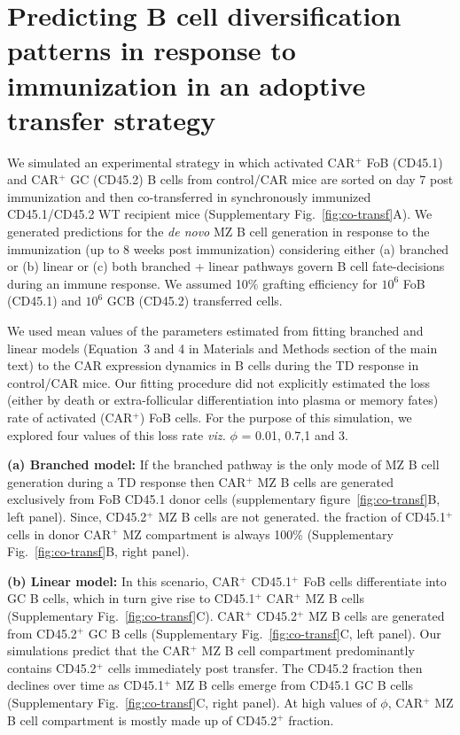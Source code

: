\documentclass[11pt]{article}
\begin{document}
 
\clearpage


\section*{Predicting B cell diversification patterns in response to immunization in an adoptive transfer strategy}

We simulated an experimental strategy in which activated CAR$^{+}$ FoB (CD45.1) and CAR$^{+}$ GC (CD45.2) B cells from control/CAR mice are sorted on day 7 post immunization and then co-transferred in synchronously immunized CD45.1/CD45.2 WT recipient mice (Supplementary Fig.~\ref{fig:co-transf}A).
We generated predictions for the \textit{de novo} MZ B cell generation in response to the immunization (up to 8 weeks post immunization) considering either (a) branched or (b) linear or (c) both branched + linear pathways govern B cell fate-decisions during an immune response.
We assumed 10\% grafting efficiency for $10^{6}$ FoB (CD45.1) and $10^{6}$ GCB (CD45.2) transferred cells. 

We used mean values of the parameters estimated from fitting branched and linear models (Equation~3 and 4 in Materials and Methods section of the main text) to the CAR expression dynamics in B cells during the TD response in control/CAR mice.
Our fitting procedure did not explicitly estimated the loss (either by death or extra-follicular differentiation into plasma or memory fates) rate of activated (CAR$^{+}$) FoB cells.
For the purpose of this simulation, we explored four values of this loss rate \textit{viz.} $\phi$ = 0.01, 0.7,1 and 3.


\textbf{(a) Branched model:}
If the branched pathway is the only mode of MZ B cell generation during a TD response then 
CAR$^{+}$  MZ B cells are generated exclusively from FoB CD45.1 donor cells (supplementary figure~\ref{fig:co-transf}B, left panel).
Since, CD45.2$^{+}$ MZ B cells are not generated.%
the fraction of CD45.1$^{+}$ cells in donor CAR$^{+}$ MZ compartment is always 100\% (Supplementary Fig.~\ref{fig:co-transf}B, right panel).

\textbf{(b) Linear model:}
In this scenario, CAR$^{+}$ CD45.1$^{+}$ FoB cells differentiate into GC B cells, which in turn give rise to CD45.1$^{+}$ CAR$^{+}$ MZ B cells (Supplementary Fig.~\ref{fig:co-transf}C). 
CAR$^{+}$ CD45.2$^{+}$ MZ B cells are generated from CD45.2$^{+}$ GC B cells (Supplementary Fig.~\ref{fig:co-transf}C, left panel).
Our simulations predict that the CAR$^{+}$ MZ B cell compartment predominantly contains CD45.2$^{+}$ cells immediately post transfer.
The CD45.2 fraction then declines over time as CD45.1$^{+}$ MZ B cells emerge from CD45.1 GC B cells (Supplementary Fig.~\ref{fig:co-transf}C, right panel).
At high values of $\phi$, CAR$^{+}$ MZ B cell compartment is mostly made up of CD45.2$^{+}$ fraction. 
\end{document}
